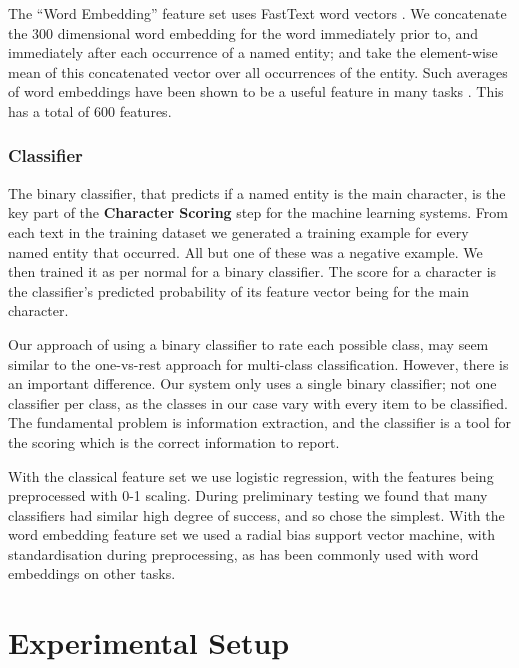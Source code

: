 \documentclass[11pt,a4paper]{article}
\newcommand{\parencite}{\citep}
\newcommand{\textcite}{\cite}
\begin{document}
The ``Word Embedding'' feature set uses FastText word vectors \parencite{bojanowski2016enriching}.
We concatenate the 300 dimensional word embedding for the word immediately prior to, and immediately after each occurrence of a named entity;
and take the element-wise mean of this concatenated vector over all occurrences of the  entity.
Such averages of word embeddings have been shown to be a useful feature in many tasks \parencite{White2015SentVecMeaning,mikolovSkip}.
This has a total of 600 features.

\subsubsection{Classifier}
The binary classifier, that predicts if a named entity is the main character, is the key part of the \textbf{Character Scoring} step for the machine learning systems.
From each text in the training dataset
we generated a training example for every named entity that occurred.
All but one of these was a negative example.
We then trained it as per normal for a binary classifier.
The score for a character is the classifier's predicted probability of its feature vector being for the main character.

Our approach of using a binary classifier to rate each possible class,
may seem similar to the one-vs-rest approach for multi-class classification.
However, there is an important difference.
Our system only uses a single binary classifier; not one classifier per class,
as the classes in our case vary with every item to be classified.
The fundamental problem is information extraction, and the classifier is a tool for the scoring which is the correct information to report.


With the classical feature set we use logistic regression, with the features being preprocessed with 0-1 scaling.
During preliminary testing we found that many classifiers had similar high degree of success, and so chose the simplest.
With the word embedding feature set we used a radial bias support vector machine, with  standardisation during preprocessing,
as has been commonly used with word embeddings on other tasks.



\section{Experimental Setup}\label{sec:experimental-setup}
\end{document}

